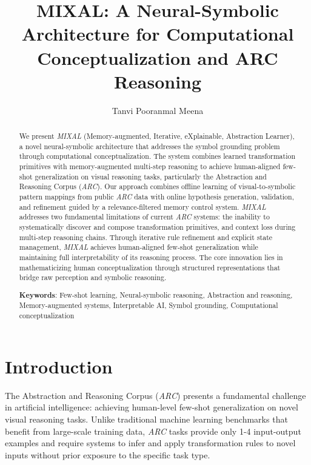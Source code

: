 \documentclass[12pt]{article}
\newcommand{\arc}{\textit{ARC}}
\newcommand{\MIXAL}{\textit{MIXAL}}
\begin{document}
\title{MIXAL: A Neural-Symbolic Architecture for Computational Conceptualization and ARC Reasoning}
\author{Tanvi Pooranmal Meena} %

\maketitle
\begin{abstract}
We present \MIXAL{} (Memory-augmented, Iterative, eXplainable, Abstraction Learner), a novel neural-symbolic architecture that addresses the symbol grounding problem through computational conceptualization. The system combines learned transformation primitives with memory-augmented multi-step reasoning to achieve human-aligned few-shot generalization on visual reasoning tasks, particularly the Abstraction and Reasoning Corpus (\arc{}). Our approach combines offline learning of visual-to-symbolic pattern mappings from public \arc{} data with online hypothesis generation, validation, and refinement guided by a relevance-filtered memory control system. \MIXAL{} addresses two fundamental limitations of current \arc{} systems: the inability to systematically discover and compose transformation primitives, and context loss during multi-step reasoning chains. Through iterative rule refinement and explicit state management, \MIXAL{} achieves human-aligned few-shot generalization while maintaining full interpretability of its reasoning process. The core innovation lies in mathematicizing human conceptualization through structured representations that bridge raw perception and symbolic reasoning.

\vspace{0.5cm}
\noindent\textbf{Keywords}: Few-shot learning, Neural-symbolic reasoning, Abstraction and reasoning, Memory-augmented systems, Interpretable AI, Symbol grounding, Computational conceptualization
\end{abstract}

\section{Introduction}

The Abstraction and Reasoning Corpus (\arc{}) presents a fundamental challenge in artificial intelligence: achieving human-level few-shot generalization on novel visual reasoning tasks. Unlike traditional machine learning benchmarks that benefit from large-scale training data, \arc{} tasks provide only 1-4 input-output examples and require systems to infer and apply transformation rules to novel inputs without prior exposure to the specific task type.
\end{document}
